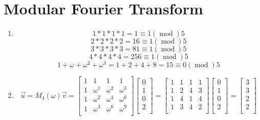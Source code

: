 \documentclass[11pt]{article}
\newenvironment{qparts}{\begin{enumerate}[{(}a{)}]}{\end{enumerate}}
\begin{document}
\newpage
\section{Modular Fourier Transform}

\begin{qparts}
	\item 
	\[
		1 * 1 * 1 * 1 = 1 \equiv 1 (\operatorname{mod}) 5
	\]
	\[
		2 * 2 * 2 * 2 = 16 \equiv 1 (\operatorname{mod}) 5
	\]
	\[
		3 * 3 * 3 * 3 = 81 \equiv 1 (\operatorname{mod}) 5
	\]
	\[
		4 * 4 * 4 * 4 = 256 \equiv 1 (\operatorname{mod}) 5
	\]
	\[
		1 + \omega +  \omega^2 + \omega^3 = 1 + 2 + 4 + 8 = 15 \equiv 0 (\operatorname{mod})5
	\]

	\item
	\[
		\vec u = M_4(\omega)\vec v
		= 
		\begin{bmatrix} 
			1 & 1 & 1 & 1 \\ 
			1 & \omega^1 & \omega^2 & \omega^3 \\ 
			1 & \omega^2 & \omega^4 & \omega^6 \\ 
			1 & \omega^3 & \omega^6 & \omega^9 \\ 
		\end{bmatrix}
		\begin{bmatrix} 
			0 \\ 
			1 \\ 
			0 \\ 
			2 \\ 
		\end{bmatrix} 
		=
		\begin{bmatrix} 
			1 & 1 & 1 & 1 \\ 
			1 & 2 & 4 & 3 \\ 
			1 & 4 & 1 & 4 \\ 
			1 & 3 & 4 & 2 \\ 
		\end{bmatrix}		
		\begin{bmatrix} 
			0 \\ 
			1 \\ 
			0 \\ 
			2 \\ 
		\end{bmatrix} 
		=
		\begin{bmatrix} 
			3 \\ 
			3 \\ 
			2 \\ 
			2 \\ 
		\end{bmatrix}
	\]


\end{qparts}
\end{document}
